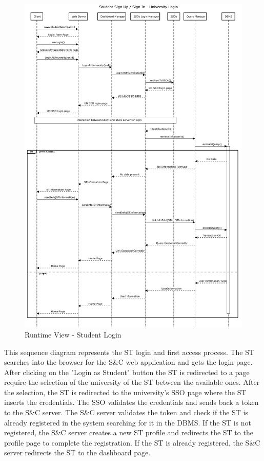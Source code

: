 \begin{figure}[H]
      \centering
      \includegraphics[width=1.0\textwidth]{Images/RV_01a.pdf}
      \caption{Runtime View - Student Login}
      \label{fig:rv-student-login}
\end{figure}

\par This sequence diagram represents the ST login and first access process. The ST searches into the browser for the
S\&C web application and gets the login page. After clicking on the "Login as Student" button the ST is redirected to
a page require the selection of the university of the ST between the available ones. After the selection, the ST is redirected
to the university's SSO page where the ST inserts the credentials. The SSO validates the credentials and sends back a
token to the S\&C server. The S\&C server validates the token and check if the ST is already registered in the system searching
for it in the DBMS. If the ST is not registered, the S\&C server creates a new ST profile and redirects the ST to the
profile page to complete the registration. If the ST is already registered, the S\&C server redirects the ST to the
dashboard page.

